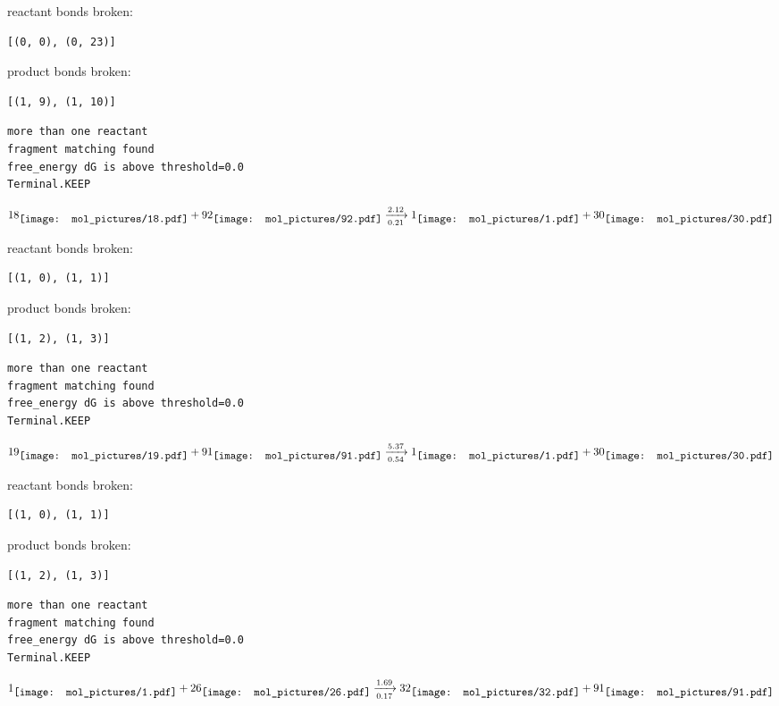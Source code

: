 \documentclass{article}
\begin{document}
reactant bonds broken:\begin{verbatim}
[(0, 0), (0, 23)]
\end{verbatim}
product bonds broken:\begin{verbatim}
[(1, 9), (1, 10)]
\end{verbatim}




\vspace{1cm}
\begin{verbatim}
more than one reactant
fragment matching found
free_energy dG is above threshold=0.0
Terminal.KEEP
\end{verbatim}
$$
18
\raisebox{-.5\height}{\texttt{[image: mol\_pictures/18.pdf]}}
+
92
\raisebox{-.5\height}{\texttt{[image: mol\_pictures/92.pdf]}}
\xrightarrow[0.21]{2.12}
1
\raisebox{-.5\height}{\texttt{[image: mol\_pictures/1.pdf]}}
+
30
\raisebox{-.5\height}{\texttt{[image: mol\_pictures/30.pdf]}}
$$


reactant bonds broken:\begin{verbatim}
[(1, 0), (1, 1)]
\end{verbatim}
product bonds broken:\begin{verbatim}
[(1, 2), (1, 3)]
\end{verbatim}




\vspace{1cm}
\begin{verbatim}
more than one reactant
fragment matching found
free_energy dG is above threshold=0.0
Terminal.KEEP
\end{verbatim}
$$
19
\raisebox{-.5\height}{\texttt{[image: mol\_pictures/19.pdf]}}
+
91
\raisebox{-.5\height}{\texttt{[image: mol\_pictures/91.pdf]}}
\xrightarrow[0.54]{5.37}
1
\raisebox{-.5\height}{\texttt{[image: mol\_pictures/1.pdf]}}
+
30
\raisebox{-.5\height}{\texttt{[image: mol\_pictures/30.pdf]}}
$$


reactant bonds broken:\begin{verbatim}
[(1, 0), (1, 1)]
\end{verbatim}
product bonds broken:\begin{verbatim}
[(1, 2), (1, 3)]
\end{verbatim}




\vspace{1cm}
\begin{verbatim}
more than one reactant
fragment matching found
free_energy dG is above threshold=0.0
Terminal.KEEP
\end{verbatim}
$$
1
\raisebox{-.5\height}{\texttt{[image: mol\_pictures/1.pdf]}}
+
26
\raisebox{-.5\height}{\texttt{[image: mol\_pictures/26.pdf]}}
\xrightarrow[0.17]{1.69}
32
\raisebox{-.5\height}{\texttt{[image: mol\_pictures/32.pdf]}}
+
91
\raisebox{-.5\height}{\texttt{[image: mol\_pictures/91.pdf]}}
$$
\end{document}
